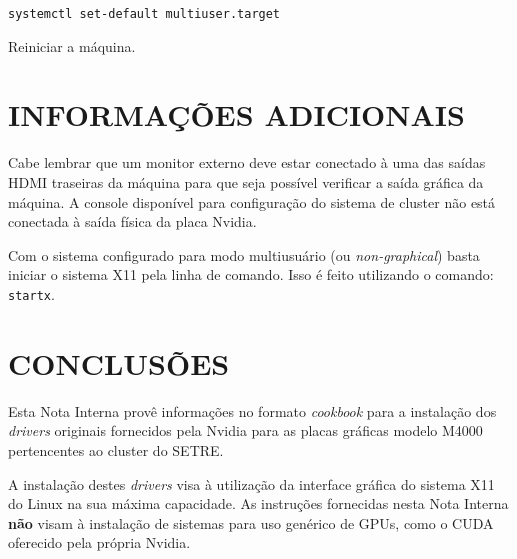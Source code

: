 \documentclass[twoside,a4paper,12pt,english]{inac17}
\begin{document}
\texttt{systemctl set-default multiuser.target}

Reiniciar a máquina.

\section{INFORMAÇÕES ADICIONAIS}

Cabe lembrar que um monitor externo deve estar conectado à uma das saídas HDMI 
traseiras da máquina para que seja possível verificar a saída gráfica da máquina. 
A console disponível para configuração do sistema de cluster não está conectada 
à saída física da placa Nvidia.

Com o sistema configurado para modo multiusuário (ou \textit{non-graphical}) 
basta iniciar o sistema X11 pela linha de comando. Isso é feito utilizando o comando: 
\texttt{startx}.

\section{CONCLUSÕES}

Esta Nota Interna provê informações no formato \textit{cookbook} para a instalação 
dos \textit{drivers} originais fornecidos pela Nvidia para as placas gráficas modelo M4000 pertencentes ao cluster do SETRE.

A instalação destes \textit{drivers} visa à utilização da interface gráfica do 
sistema X11 do Linux na sua máxima capacidade. As instruções fornecidas nesta Nota 
Interna \textbf{não} visam à instalação de sistemas para uso genérico de GPUs, 
como o CUDA oferecido pela própria Nvidia.




\end{document}
